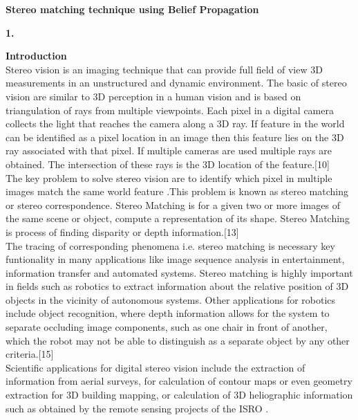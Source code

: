 {\Large\textbf{Stereo matching technique using Belief Propagation}\\

{\Large\textbf{1.} \vspace{0.5in} {\Large\textbf{Introduction}\\
Stereo vision is an imaging technique that can provide full field of view 3D measurements in an unstructured and dynamic environment. The basic of stereo vision are similar to 3D perception in a human vision and is based on triangulation of rays from multiple viewpoints. Each pixel in a digital camera collects the light that reaches the camera along a 3D ray. If feature in the world can be identified as a pixel location in an image then this feature lies on the 3D ray associated with that pixel. If multiple cameras are used multiple rays are obtained. The intersection of these rays is the 3D location of the feature.[10]\\
The key problem to solve stereo vision are to identify which pixel in multiple images match the same world feature .This problem is known as stereo matching or stereo correspondence. Stereo Matching is for a given two or more images of the same scene or object, compute a representation of its shape. Stereo Matching is process of finding disparity or depth information.[13]\\
The tracing of corresponding phenomena i.e. stereo matching is necessary key funtionality in many applications like image sequence analysis in entertainment, information transfer and automated systems. Stereo matching is highly important in fields such as robotics to extract information about the relative position of 3D objects in the vicinity of autonomous systems. Other applications for robotics include object recognition, where depth information allows for the system to separate occluding image components, such as one chair in front of another, which the robot may not be able to distinguish as a separate object by any other criteria.[15]\\
Scientific applications for digital stereo vision include the extraction of information from aerial surveys, for calculation of contour maps or even geometry extraction for 3D building mapping, or calculation of 3D heliographic information such as obtained by the remote sensing projects of the ISRO .

}}}
